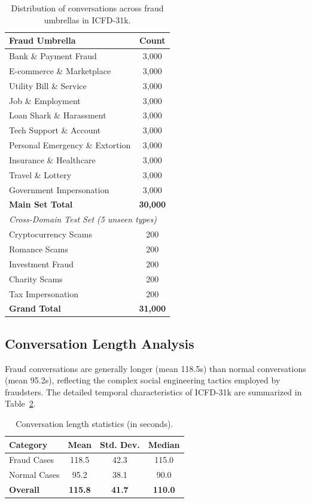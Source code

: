 \documentclass{article}
\begin{document}
\begin{table}[h!]
\centering
\caption{Distribution of conversations across fraud umbrellas in ICFD-31k.}
\label{tab:umbrella_dist_app}
\begin{tabular}{@{}lc@{}}
\toprule
\textbf{Fraud Umbrella} & \textbf{Count} \\ \midrule
Bank \& Payment Fraud & 3,000 \\
E-commerce \& Marketplace & 3,000 \\
Utility Bill \& Service & 3,000 \\
Job \& Employment & 3,000 \\
Loan Shark \& Harassment & 3,000 \\
Tech Support \& Account & 3,000 \\
Personal Emergency \& Extortion & 3,000 \\
Insurance \& Healthcare & 3,000 \\
Travel \& Lottery & 3,000 \\
Government Impersonation & 3,000 \\
\midrule
\textbf{Main Set Total} & \textbf{30,000} \\
\midrule
\multicolumn{2}{l}{\textit{Cross-Domain Test Set (5 unseen types)}} \\
Cryptocurrency Scams & 200 \\
Romance Scams & 200 \\
Investment Fraud & 200 \\
Charity Scams & 200 \\
Tax Impersonation & 200 \\
\midrule
\textbf{Grand Total} & \textbf{31,000} \\
\bottomrule
\end{tabular}
\end{table}

\subsection{Conversation Length Analysis}
Fraud conversations are generally longer (mean 118.5s) than normal conversations (mean 95.2s), reflecting the complex social engineering tactics employed by fraudsters. The detailed temporal characteristics of ICFD-31k are summarized in Table~\ref{tab:length_stats}.

\begin{table}[h!]
\centering
\caption{Conversation length statistics (in seconds).}
\label{tab:length_stats}
\begin{tabular}{@{}lccc@{}}
\toprule
\textbf{Category} & \textbf{Mean} & \textbf{Std. Dev.} & \textbf{Median} \\ \midrule
Fraud Cases & 118.5 & 42.3 & 115.0 \\
Normal Cases & 95.2 & 38.1 & 90.0 \\
\midrule
\textbf{Overall} & \textbf{115.8} & \textbf{41.7} & \textbf{110.0} \\
\bottomrule
\end{tabular}
\end{table}
\end{document}
